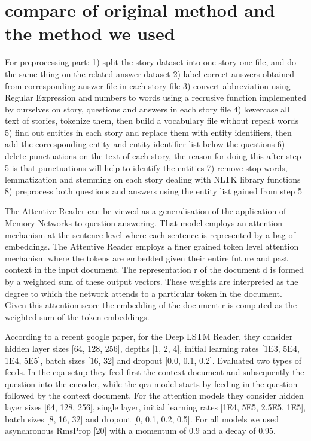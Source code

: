 \documentclass[runningheads,a4paper]{llncs}
\begin{document}
\section{compare of original method and the method we used}
For preprocessing part:
1) split the story dataset into one story one file, and do the same thing on the related answer dataset 
2) label correct answers obtained from corresponding answer file
in each story file 
3) convert abbreviation using Regular Expression and numbers to words using a recrusive function implemented by ourselves on story, questions and answers in each story file 
4) lowercase all text of stories, tokenize them, then build a vocabulary file without repeat words
5) find out entities in each story and replace them with entity identifiers, then add the corresponding entity and entity identifier list below the questions
6) delete punctuations on the text of each story, the reason for doing this after step 5 is that punctuations will help to identify the entities 
7) remove stop words, lemmatization and stemming on each story dealing with NLTK library functions
8) preprocess both questions and answers using the entity list gained from step 5

The Attentive Reader can be viewed as a generalisation of the application of Memory Networks to question answering. That model employs an attention mechanism at the sentence level where each sentence is represented by a bag of embeddings. The Attentive Reader employs a finer grained token level attention mechanism where the tokens are embedded given their entire future and past context in the input document. 
The representation r of the document d is formed by a weighted sum of these output vectors. These weights are interpreted as the degree to which the network attends to a particular token in the document. Given this attention score the embedding of the document r is computed as the weighted sum of the token embeddings. 

According to a recent google paper, for the Deep LSTM Reader, they consider hidden layer sizes [64, 128, 256], depths [1, 2, 4], initial learning rates [1E3, 5E4, 1E4, 5E5], batch sizes [16, 32] and dropout [0.0, 0.1, 0.2]. Evaluated two types of feeds. In the cqa setup they feed first the context document and subsequently the question into the encoder, while the qca model starts by feeding in the question followed by the context document. For the attention models they consider hidden layer sizes [64, 128, 256], single layer, initial learning rates [1E4, 5E5, 2.5E5, 1E5], batch sizes [8, 16, 32] and dropout [0, 0.1, 0.2, 0.5]. For all models we used asynchronous RmsProp [20] with a momentum of 0.9 and a decay of 0.95. 
\end{document}
